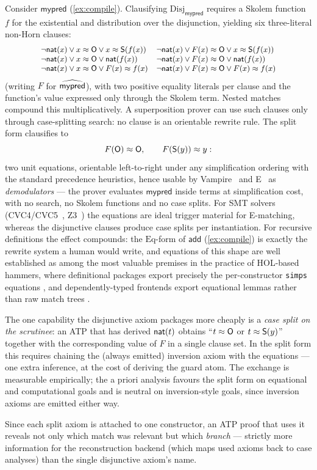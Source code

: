 Consider $\mathsf{mypred}$ (\cref{ex:compile}).  Clausifying
$\mathrm{Disj}_{\mathsf{mypred}}$ requires a Skolem function $f$ for the
existential and distribution over the disjunction, yielding six
three-literal non-Horn clauses:
\[
\small
\begin{array}{ll}
  \neg \mathsf{nat}(x) \vee x \approx \mathsf{O} \vee x \approx \mathsf{S}(f(x)) &
  \neg \mathsf{nat}(x) \vee F(x) \approx \mathsf{O} \vee x \approx \mathsf{S}(f(x)) \\
  \neg \mathsf{nat}(x) \vee x \approx \mathsf{O} \vee \mathsf{nat}(f(x)) &
  \neg \mathsf{nat}(x) \vee F(x) \approx \mathsf{O} \vee \mathsf{nat}(f(x)) \\
  \neg \mathsf{nat}(x) \vee x \approx \mathsf{O} \vee F(x) \approx f(x) &
  \neg \mathsf{nat}(x) \vee F(x) \approx \mathsf{O} \vee F(x) \approx f(x)
\end{array}
\]
(writing $F$ for $\widehat{\mathsf{mypred}}$), with two positive equality
literals per clause and the function's value expressed only through the
Skolem term.  Nested matches compound this multiplicatively.  A
superposition prover can use such clauses only through case-splitting
search: no clause is an orientable rewrite rule.  The split form
clausifies to
\[
  F(\mathsf{O}) \approx \mathsf{O}, \qquad F(\mathsf{S}(y)) \approx y :
\]
two unit equations, orientable left-to-right under any simplification
ordering with the standard precedence heuristics, hence usable by
Vampire~\cite{KovacsVoronkov2013} and E~\cite{Schulz2002} as
\emph{demodulators} --- the prover evaluates $\mathsf{mypred}$ inside
terms at simplification cost, with no search, no Skolem functions and no
case splits.  For SMT solvers (CVC4/CVC5~\cite{BarrettEtAl2011},
Z3~\cite{deMouraBjorner2008}) the equations are ideal trigger material
for E-matching, whereas the disjunctive clauses produce case splits per
instantiation.  For recursive definitions the effect compounds: the
$\mathrm{Eq}$-form of $\mathsf{add}$ (\cref{ex:compile}) is exactly the
rewrite system a human would write, and equations of this shape are
well established as among the most valuable premises in the practice of
HOL-based hammers, where definitional packages export precisely the
per-constructor \texttt{simps} equations
\cite{Krauss2010,BlanchetteEtAl2016qed}, and dependently-typed frontends
export equational lemmas rather than raw match trees
\cite{QianEtAl2025}.

The one capability the disjunctive axiom packages more cheaply is a
\emph{case split on the scrutinee}: an ATP that has derived $\mathsf{nat}(t)$
obtains ``$t \approx \mathsf{O}$ or $t \approx \mathsf{S}(y)$'' together with the
corresponding value of $F$ in a single clause set.  In the split form
this requires chaining the (always emitted) inversion axiom with the
equations --- one extra inference, at the cost of deriving the guard
atom.  The exchange is measurable empirically; the a priori analysis
favours the split form on equational and computational goals and is
neutral on inversion-style goals, since inversion axioms are emitted
either way.

\begin{remark}
Since each split axiom is attached to one constructor, an ATP proof
that uses it reveals not only which match was relevant but which
\emph{branch} --- strictly more information for the reconstruction
backend (which maps used axioms back to case analyses) than the single
disjunctive axiom's name.
\end{remark}
